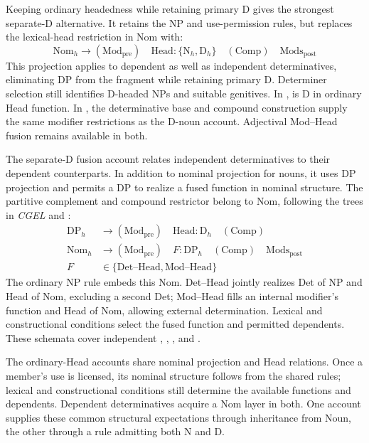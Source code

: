 \documentclass[12pt]{article}
\begin{document}
Keeping ordinary headedness while retaining primary D gives the strongest separate-D alternative. It retains the NP and use-permission rules, but replaces the lexical-head restriction in Nom with:
\[
\mathrm{Nom}_{h}\to(\mathrm{Mod}_{\mathrm{pre}})\quad\mathrm{Head}:\{\mathrm{N}_{h},\mathrm{D}_{h}\}\quad(\mathrm{Comp})\quad\mathrm{Mods}_{\mathrm{post}}
\]
This projection applies to dependent as well as independent determinatives, eliminating DP from the fragment while retaining primary D. Determiner selection still identifies D-headed NPs and suitable genitives. In ,  is D in ordinary Head function. In , the determinative base and compound construction supply the same modifier restrictions as the D-noun account. Adjectival Mod--Head fusion remains available in both.

The separate-D fusion account relates independent determinatives to their dependent counterparts. In addition to nominal projection for nouns, it uses DP projection and permits a DP to realize a fused function in nominal structure. The partitive complement and compound restrictor belong to Nom, following the trees in \textit{CGEL} and \textcite[582]{Payne2007}:
\[
\begin{aligned}
\mathrm{DP}_{h} &\to (\mathrm{Mod}_{\mathrm{pre}})\quad \mathrm{Head}:\mathrm{D}_{h}\quad (\mathrm{Comp}) \\
\mathrm{Nom}_{h} &\to (\mathrm{Mod}_{\mathrm{pre}})\quad F:\mathrm{DP}_{h}\quad (\mathrm{Comp})\quad \mathrm{Mods}_{\mathrm{post}} \\
F&\in\{\mathrm{Det\text{--}Head},\mathrm{Mod\text{--}Head}\}
\end{aligned}
\]
The ordinary NP rule embeds this Nom. Det--Head jointly realizes Det of NP and Head of Nom, excluding a second Det; Mod--Head fills an internal modifier's function and Head of Nom, allowing external determination. Lexical and constructional conditions select the fused function and permitted dependents. These schemata cover independent , , , and .

The ordinary-Head accounts share nominal projection and Head relations. Once a member's use is licensed, its nominal structure follows from the shared rules; lexical and constructional conditions still determine the available functions and dependents. Dependent determinatives acquire a Nom layer in both. One account supplies these common structural expectations through inheritance from Noun, the other through a rule admitting both N and D.
\end{document}
